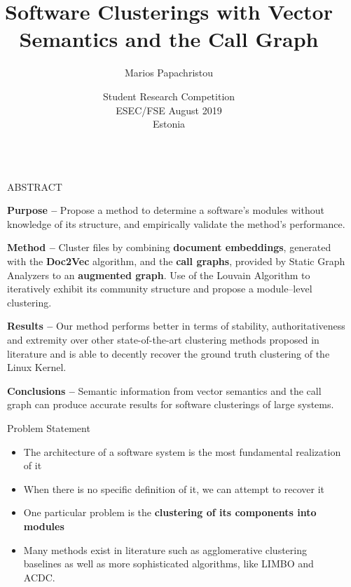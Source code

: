 \documentclass[final]{beamer}
\title{Software Clusterings with Vector Semantics and the Call Graph}
\author[Marios Papachristou]{Marios Papachristou}
\institute[BaLab]{BALab, Athens University of Economics and Bussiness \\ National Technical University of Athens \\ Advisor: Prof. Diomidis Spinellis}
\date[ESEC/FSE 2019 SRC]{Student Research Competition \\ ESEC/FSE August 2019 \\ Estonia}
\newlength{\sepwidth}
\newlength{\colwidth}
\newcommand{\separatorcolumn}{\begin{column}{\sepwidth}\end{column}}
\begin{document}
\begin{frame}[t]
\begin{columns}[t]
\separatorcolumn

\begin{column}{\colwidth}

  \begin{alertblock}{ABSTRACT}
  
  	\textbf{Purpose --}  Propose a method to determine a software’s modules
without knowledge of its structure, and empirically validate the
method’s performance.

	\textbf{Method --} Cluster files by combining \textbf{document embeddings}, generated with the \textbf{Doc2Vec} algorithm, and the \textbf{call graphs}, provided
by Static Graph Analyzers to an \textbf{augmented graph}. Use of the Louvain Algorithm to iteratively exhibit its community structure and propose a module–level clustering.

	\textbf{Results --} Our method performs better in terms of stability, 			authoritativeness and extremity over other state-of-the-art clustering
methods proposed in literature and is able to decently recover the
ground truth clustering of the Linux Kernel.
	
	\textbf{Conclusions --} Semantic information from vector semantics and
the call graph can produce accurate results for software clusterings
of large systems.
  \end{alertblock}


  \begin{block}{Problem Statement}
	
	\begin{itemize}
    \item The architecture of a software system is the most fundamental realization of it
    \item When there is no specific definition of it, we can attempt to recover it
    \item One particular problem is the \textbf{clustering of its components into modules} 
    \item Many methods exist in literature such as agglomerative clustering baselines as well as more sophisticated algorithms, like LIMBO and ACDC. 
\end{itemize}



  \end{block}

  
  
  
  

\end{column}
\end{columns}
\end{frame}
\end{document}
